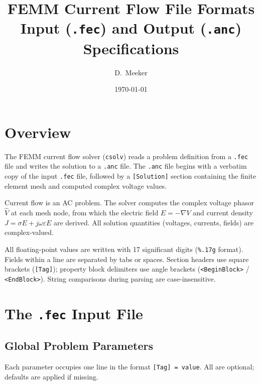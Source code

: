 \documentclass[11pt]{article}
\title{FEMM Current Flow File Formats\\[0.5em]
\large Input (\texttt{.fec}) and Output (\texttt{.anc}) Specifications}
\author{D.\ Meeker}
\date{\today}
\begin{document}
\maketitle
\tableofcontents
\newpage

\section{Overview}

The FEMM current flow solver (\texttt{csolv}) reads a problem
definition from a \texttt{.fec} file and writes the solution to a
\texttt{.anc} file.  The \texttt{.anc} file begins with a verbatim
copy of the input \texttt{.fec} file, followed by a
\texttt{[Solution]} section containing the finite element mesh and
computed complex voltage values.

Current flow is an AC problem.  The solver computes the complex
voltage phasor $\hat{V}$ at each mesh node, from which the electric
field $E = -\nabla V$ and current density $J = \sigma E + j\omega
\varepsilon E$ are derived.  All solution quantities (voltages,
currents, fields) are complex-valued.

All floating-point values are written with 17 significant digits
(\verb|%.17g| format).  Fields within a line are separated by tabs or
spaces.  Section headers use square brackets (\verb|[Tag]|); property
block delimiters use angle brackets (\verb|<BeginBlock>| /
\verb|<EndBlock>|).  String comparisons during parsing are
case-insensitive.

\section{The \texttt{.fec} Input File}

\subsection{Global Problem Parameters}

Each parameter occupies one line in the format
\verb|[Tag] = value|.  All are optional; defaults are applied if
missing.
\end{document}
